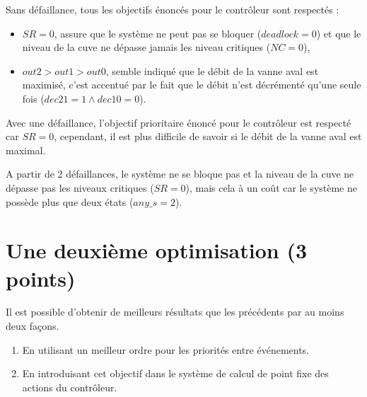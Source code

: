 \documentclass[a4paper]{book}
\begin{document}
Sans défaillance, tous les objectifs énoncés pour le contrôleur sont respectés :
\begin{itemize}
  \item $SR = 0$, assure que le système ne peut pas se bloquer ($deadlock = 0$)
    et que le niveau de la cuve ne dépasse jamais les niveau critiques ($NC =
    0$),
  \item $out2 > out1 > out0$, semble indiqué que le débit de la vanne aval est
    maximisé, c'est accentué par le fait que le débit n'est décrémenté qu'une
    seule fois ($dec21 = 1 \wedge dec10 = 0$).
\end{itemize}


Avec une défaillance, l'objectif prioritaire énoncé pour le contrôleur est
respecté car $SR = 0$, cependant, il est plus difficile de savoir si le débit
de la vanne aval est maximal.

A partir de 2 défaillances, le système ne se bloque pas et la niveau de la cuve
ne dépasse pas les niveaux critiques ($SR = 0$), mais cela à un coût car le
système ne possède plus que deux états ($any\_s = 2$).

\section{Une deuxième optimisation (3 points)}

Il est possible d'obtenir de meilleurs résultats que les précédents par au moins deux façons.
\begin{enumerate}
\item En utilisant un meilleur ordre pour les priorités entre événements.
\item En introduisant cet objectif dans le système de calcul de point fixe des actions du contrôleur.
\end{enumerate}
\end{document}
